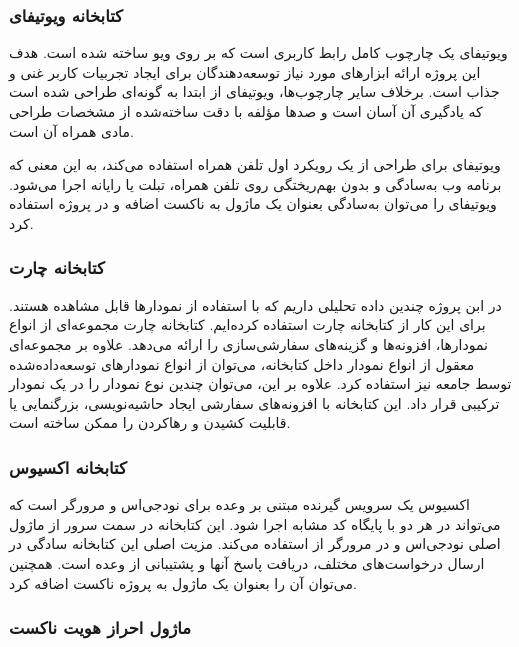 \subsubsection{کتابخانه ویوتیفای}

ویوتیفای یک چارچوب کامل رابط کاربری است که بر روی ویو ساخته شده است. هدف این پروژه ارائه ابزارهای مورد نیاز توسعه‌دهندگان برای ایجاد تجربیات کاربر غنی و جذاب است. برخلاف سایر چارچوب‌ها، ویوتیفای از ابتدا به گونه‌ای طراحی شده است که یادگیری آن آسان است و صدها مؤلفه با دقت ساخته‌شده از مشخصات طراحی مادی همراه آن است\cite{vuetify}.

ویوتیفای برای طراحی از یک رویکرد اول تلفن همراه استفاده می‌کند، به این معنی که برنامه وب به‌سادگی و بدون بهم‌ریختگی روی تلفن همراه، تبلت یا رایانه اجرا می‌شود. ویوتیفای را می‌توان به‌سادگی بعنوان یک ماژول به ناکست اضافه و در پروژه استفاده کرد\cite{vuetify}.


\subsubsection{کتابخانه چارت}

در ابن پروژه چندین داده تحلیلی داریم که با استفاده از نمودارها قابل مشاهده هستند. برای این کار از کتابخانه چارت‌ استفاده کرده‌ایم. کتابخانه چارت مجموعه‌ای از انواع نمودارها، افزونه‌ها و گزینه‌های سفارشی‌سازی را ارائه می‌دهد. علاوه بر مجموعه‌ای معقول از انواع نمودار داخل کتابخانه، می‌توان از انواع نمودارهای توسعه‌داده‌شده توسط جامعه نیز استفاده کرد. علاوه بر این، می‌توان چندین نوع نمودار را در یک نمودار ترکیبی قرار داد. این کتابخانه با افزونه‌های سفارشی ایجاد حاشیه‌نویسی، بزرگنمایی یا قابلیت کشیدن و رهاکردن را ممکن ساخته است\cite{chart}.

\subsubsection{کتابخانه اکسیوس}

اکسیوس یک سرویس گیرنده  مبتنی بر وعده برای نودجی‌اس و مرورگر است که می‌تواند در هر دو با پایگاه کد مشابه اجرا شود. این کتابخانه در سمت سرور از ماژول اصلی  نودجی‌اس و در مرورگر از  استفاده می‌کند. مزیت اصلی این کتابخانه سادگی در ارسال درخواست‌های مختلف، دریافت پاسخ آنها و پشتیبانی از  وعده است\cite{axios}. همچنین می‌توان آن را بعنوان یک ماژول به پروژه ناکست اضافه کرد.

\subsubsection{ماژول احراز هویت ناکست}

